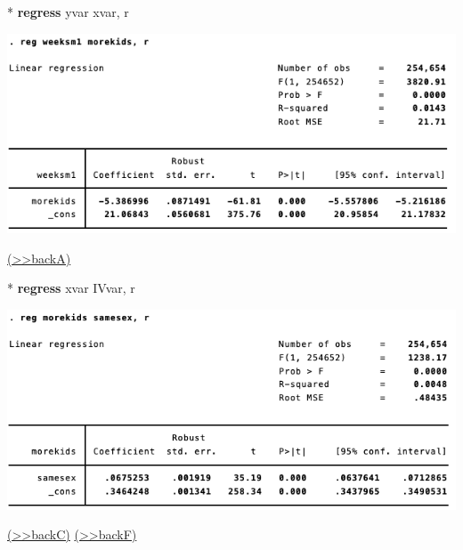 \documentclass[
  10pt,
  ignorenonframetext,
]{beamer}
\newenvironment{Shaded}{\begin{snugshade}}{\end{snugshade}}
\newcommand{\FunctionTok}[1]{\textcolor[rgb]{0.00,0.00,0.00}{#1}}
\newcommand{\KeywordTok}[1]{\textcolor[rgb]{0.13,0.29,0.53}{\textbf{#1}}}
\newcommand{\NormalTok}[1]{#1}
\begin{document}
\begin{frame}[fragile]{}
\protect\hypertarget{res1-regOLS}{}
\small

\begin{Shaded}
\begin{Highlighting}[]
\NormalTok{* }\KeywordTok{regress}\NormalTok{ yvar xvar, }\FunctionTok{r}
\end{Highlighting}
\end{Shaded}

\begin{center}\includegraphics[width=1\linewidth]{pictures/res1-regOLS} \end{center}

\footnotesize \protect\hyperlink{q1-regOLS}{(\textgreater\textgreater backA)}
\normalsize
\end{frame}

\begin{frame}[fragile]{}
\protect\hypertarget{res2-regFirstStage}{}
\small

\begin{Shaded}
\begin{Highlighting}[]
\NormalTok{* }\KeywordTok{regress}\NormalTok{ xvar IVvar, }\FunctionTok{r}
\end{Highlighting}
\end{Shaded}

\begin{center}\includegraphics[width=1\linewidth]{pictures/res2-regFirstStage} \end{center}

\footnotesize \protect\hyperlink{q2-regFirstStage}{(\textgreater\textgreater backC)}
\normalsize
\footnotesize \protect\hyperlink{IVestatFirstStage}{(\textgreater\textgreater backF)}
\normalsize
\end{frame}
\end{document}
